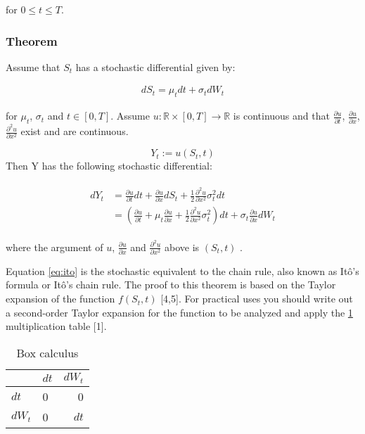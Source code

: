 \documentclass[12pt,twoside]{reedthesis}
\theoremstyle{definition}
\theoremstyle{definition}
\theoremstyle{remark}
\begin{document}
  \noindent
  for \(0 \leq t \leq T\).
  
  \subsubsection{Theorem}\label{theorem}
  
  Assume that \(S_t\) has a stochastic differential given by:
  
  \begin{align}
  dS_t = \mu_t dt + \sigma_t dW_t 
  \end{align}
  
  \noindent
  for \(\mu_t\), \(\sigma_t\) and \(t \in [0,T]\). Assume
  \(u: \mathbb{R} \times [0, T] \rightarrow \mathbb{R}\) is continuous and
  that \(\frac{\partial u}{\partial t}\),
  \(\frac{\partial u}{\partial x}\), \(\frac{\partial^2 u}{\partial x^2}\)
  exist and are continuous.
  
  \[Y_t := u(S_t, t)\] \noindent
  Then Y has the following stochastic differential:
  
  \begin{align} 
  \label{eq:ito}
  \begin{split}
      dY_t &= \frac{\partial u}{\partial t}dt + \frac{\partial u}{\partial x} dS_t + \frac{1}{2}\frac{\partial^2 u}{\partial x^2}\sigma_t^2 dt  \\[10pt] 
      &= \left( \frac{\partial u}{\partial t} + \mu_t \frac{\partial u}{\partial x} + \frac{1}{2}\frac{\partial^2 u}{\partial x^2}\sigma_t^2 \right) dt + \sigma_t \frac{\partial u}{\partial x} dW_t
  \end{split}
  \end{align}
  
  \noindent  where the argument of \(u\),
  \(\frac{\partial u}{\partial x}\) and
  \(\frac{\partial^2 u}{\partial x^2}\) above is \(\left( S_t, t \right)\)
  .
  
  Equation \eqref{eq:ito} is the stochastic equivalent to the chain rule,
  also known as Itô's formula or Itô's chain rule. The proof to this
  theorem is based on the Taylor expansion of the function \(f(S_t, t)\)
  {[}4,5{]}. For practical uses you should write out a second-order Taylor
  expansion for the function to be analyzed and apply the
  \ref{tab:box-calc} multiplication table {[}1{]}.
  
  \begin{longtable}[t]{llr}
  \caption{\label{tab:box-calc}Box calculus}\\
  \toprule
    & $dt$ & $dW_t$\\
  \midrule
  $dt$ & 0 & 0\\
  $dW_t$ & 0 & $dt$\\
  \bottomrule
  \end{longtable}
  
\end{document}
